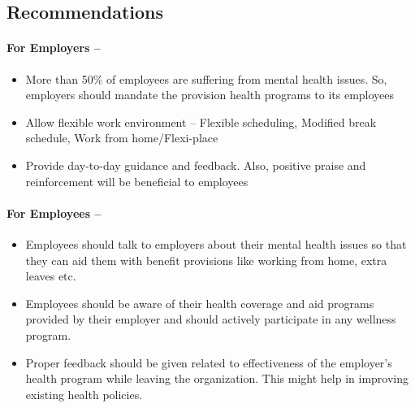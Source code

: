 \documentclass[11pt]{article}
\providecommand{\tightlist}{%
      \setlength{\itemsep}{0pt}\setlength{\parskip}{0pt}}
\begin{document}
    \hypertarget{recommendations}{%
\subsection{Recommendations}\label{recommendations}}

\hypertarget{for-employers}{%
\paragraph{For Employers --}\label{for-employers}}

\begin{itemize}
\tightlist
\item
  More than 50\% of employees are suffering from mental health issues.
  So, employers should mandate the provision health programs to its
  employees
\item
  Allow flexible work environment -- Flexible scheduling, Modified break
  schedule, Work from home/Flexi-place
\item
  Provide day-to-day guidance and feedback. Also, positive praise and
  reinforcement will be beneficial to employees
\end{itemize}

\hypertarget{for-employees}{%
\paragraph{For Employees --}\label{for-employees}}

\begin{itemize}
\tightlist
\item
  Employees should talk to employers about their mental health issues so
  that they can aid them with benefit provisions like working from home,
  extra leaves etc.
\item
  Employees should be aware of their health coverage and aid programs
  provided by their employer and should actively participate in any
  wellness program.
\item
  Proper feedback should be given related to effectiveness of the
  employer's health program while leaving the organization. This might
  help in improving existing health policies.
\end{itemize}


    
    
    
    
\end{document}
